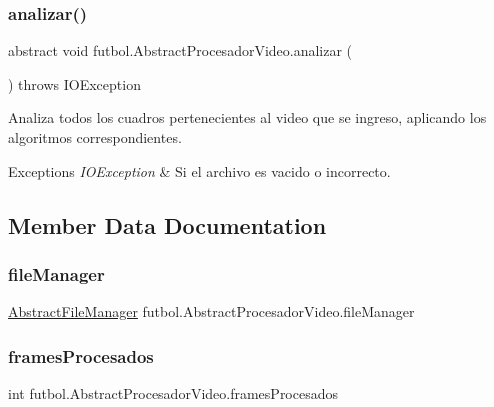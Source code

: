 \subsubsection{\texorpdfstring{analizar()}{analizar()}}
{\footnotesize\ttfamily abstract void futbol.\+Abstract\+Procesador\+Video.\+analizar (\begin{DoxyParamCaption}{ }\end{DoxyParamCaption}) throws I\+O\+Exception\hspace{0.3cm}{\ttfamily [abstract]}}

Analiza todos los cuadros pertenecientes al video que se ingreso, aplicando los algoritmos correspondientes. 
\begin{DoxyExceptions}{Exceptions}
{\em I\+O\+Exception} & Si el archivo es vacido o incorrecto. \\
\hline
\end{DoxyExceptions}


\subsection{Member Data Documentation}
\hypertarget{classfutbol_1_1_abstract_procesador_video_a87e5c185e420907d8382a14c7e52c2a0}{}\label{classfutbol_1_1_abstract_procesador_video_a87e5c185e420907d8382a14c7e52c2a0} 
\subsubsection{\texorpdfstring{file\+Manager}{fileManager}}
{\footnotesize\ttfamily \hyperlink{classfutbol_1_1_abstract_file_manager}{Abstract\+File\+Manager} futbol.\+Abstract\+Procesador\+Video.\+file\+Manager\hspace{0.3cm}{\ttfamily [protected]}}

\hypertarget{classfutbol_1_1_abstract_procesador_video_ae51605e84bb0c5baaee9ef9ed92d3df1}{}\label{classfutbol_1_1_abstract_procesador_video_ae51605e84bb0c5baaee9ef9ed92d3df1} 
\subsubsection{\texorpdfstring{frames\+Procesados}{framesProcesados}}
{\footnotesize\ttfamily int futbol.\+Abstract\+Procesador\+Video.\+frames\+Procesados\hspace{0.3cm}{\ttfamily [protected]}}

